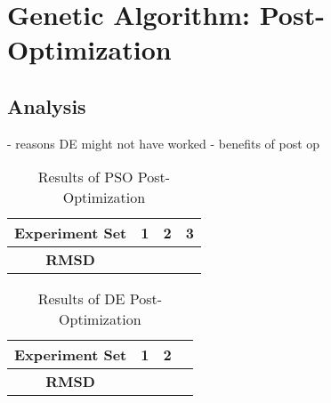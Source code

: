 \section{Genetic Algorithm: Post-Optimization}

\subsection{Analysis}

- reasons DE might not have worked
- benefits of post op

\begin{table}
	\label{table:post-op-pso-results}
	\centering
	\begin{tabular}{ | >{\bfseries}c | c | c | c | }
		\hline
		Experiment Set & 1 & 2 & 3 \\ \hline
		RMSD &  &  &  \\ \hline
	\end{tabular}
	\caption{Results of PSO Post-Optimization}
\end{table}

\begin{table}
	\label{table:post-op-de-results}
	\centering
	\begin{tabular}{ | >{\bfseries}c | c | c | c | }
		\hline
		Experiment Set & 1 & 2 \\ \hline
		RMSD &  &  \\ \hline
	\end{tabular}
	\caption{Results of DE Post-Optimization}
\end{table}